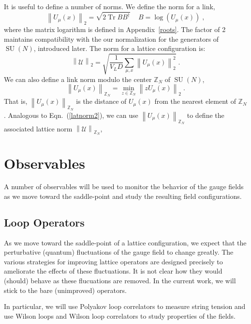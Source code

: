 \documentclass[preprint,aps,prd]{revtex4-2}
\newcommand{\be}{\begin{equation}}
\newcommand{\eq}{\end{equation}}
\newcommand{\zentrum}{{\mathbb{Z}_N}}       %
\newcommand{\config}{\mathcal{U}}
\DeclareMathOperator{\SU}{SU}
\DeclareMathOperator{\Tr}{Tr}
\begin{document}
It is useful to define a number of norms.  We define the norm
for a link,
%
\be
\left\lVert U_\mu(x) \right\rVert_2 =
   \sqrt{2 \Tr B B^\dagger} \, \quad B = \log\left(U_\mu(x)\right) \; ,
\eq
where the matrix logarithm is defined in Appendix~\ref{roots}.
The factor of 2 maintains compatibility with the our normalization
for the generators of $\SU(N)$, introduced later.
The norm for a lattice configuration is:
\be
   \left\lVert \config \right\rVert_2 =
   \sqrt{\frac{1}{V_L D} \sum_{\mu,x} \left\lVert U_\mu(x) \right\rVert_2^2}
   \; . \label{latnorm2}
\eq
%
%
We can also define a link norm modulo the center $\zentrum$ of $\SU(N)$,
\be
\left\lVert U_\mu(x) \right\rVert_\zentrum =
    \min_{z\in \zentrum} \left\lVert z U_\mu(x) \right\rVert_2 \; .
\eq
That is, $\left\lVert U_\mu(x) \right\rVert_\zentrum$ is the distance
of $U_\mu(x)$ from the nearest element of $\zentrum$.
Analogous to Eqn.~(\ref{latnorm2}), we can
use $\left\lVert U_\mu(x) \right\rVert_\zentrum$ to define
the associated lattice norm $\left\lVert \config \right\rVert_\zentrum$,

\section{Observables}

A number of observables will be used to monitor the behavior of the
gauge fields as we move toward the saddle-point and study the
resulting field configurations.

\subsection{Loop Operators}

As we move toward the saddle-point of a lattice configuration,
we expect that the perturbative (quantum) fluctuations of
the gauge field to change greatly.  The various strategies for
improving lattice operators are designed precisely to ameliorate
the effects of these fluctuations.
It is not clear how they would (should) behave as these flucuations
are removed.  In the current work, we will stick to
the bare (unimproved) operators.

In particular, we will use Polyakov loop correlators to measure
string tension and use Wilson loops and Wilson loop correlators to
study properties of the fields.
\end{document}
